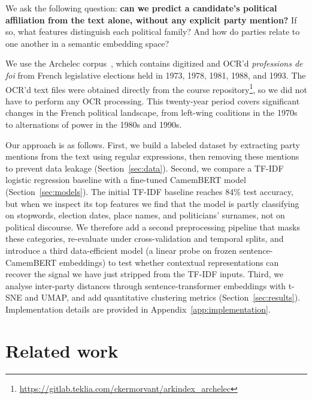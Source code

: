 \documentclass{article}
\begin{document}
We ask the following question: \textbf{can we predict a candidate's political affiliation from the text alone, without any explicit party mention?} If so, what features distinguish each political family? And how do parties relate to one another in a semantic embedding space?

We use the Archelec corpus~\citep{archelec}, which contains digitized and OCR'd \textit{professions de foi} from French legislative elections held in 1973, 1978, 1981, 1988, and 1993. The OCR'd text files were obtained directly from the course repository\footnote{\url{https://gitlab.teklia.com/ckermorvant/arkindex\_archelec}}, so we did not have to perform any OCR processing. This twenty-year period covers significant changes in the French political landscape, from left-wing coalitions in the 1970s to alternations of power in the 1980s and 1990s.

Our approach is as follows. First, we build a labeled dataset by extracting party mentions from the text using regular expressions, then removing these mentions to prevent data leakage (Section~\ref{sec:data}). Second, we compare a TF-IDF logistic regression baseline with a fine-tuned CamemBERT model~\citep{martin2020camembert} (Section~\ref{sec:models}). The initial TF-IDF baseline reaches 84\% test accuracy, but when we inspect its top features we find that the model is partly classifying on stopwords, election dates, place names, and politicians' surnames, not on political discourse. We therefore add a second preprocessing pipeline that masks these categories, re-evaluate under cross-validation and temporal splits, and introduce a third data-efficient model (a linear probe on frozen sentence-CamemBERT embeddings) to test whether contextual representations can recover the signal we have just stripped from the TF-IDF inputs. Third, we analyse inter-party distances through sentence-transformer embeddings with t-SNE and UMAP, and add quantitative clustering metrics (Section~\ref{sec:results}). Implementation details are provided in Appendix~\ref{app:implementation}.

\section{Related work}
\label{sec:related}
\end{document}
